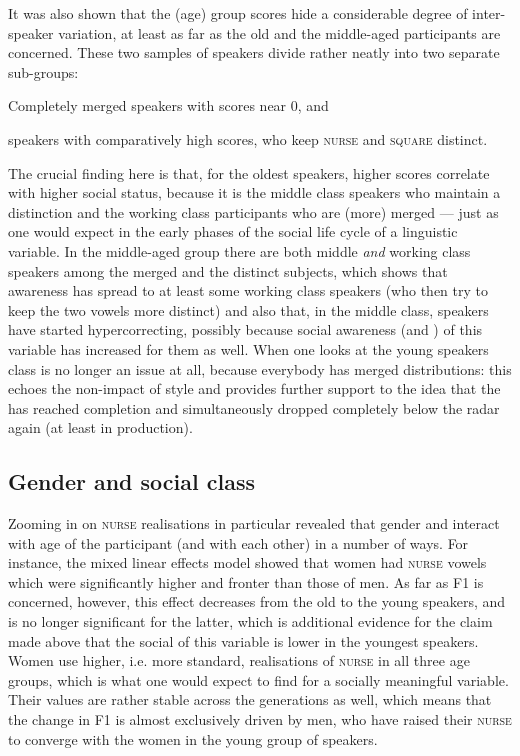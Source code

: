 It was also shown that the (age) group  scores hide a considerable degree of inter-speaker variation, at least as far as the old and the middle-aged participants are concerned.
These two samples of speakers divide rather neatly into two separate sub-groups:
\begin{inparaenum}[(1)]
	\item Completely merged speakers with  scores near 0, and
	\item speakers with comparatively high  scores, who keep \textsc{nurse} and \textsc{square} distinct.
\end{inparaenum}
The crucial finding here is that, for the oldest speakers, higher  scores correlate with higher social status, because it is the middle class speakers who maintain a distinction and the working class participants who are (more) merged --- just as one would expect in the early phases of the social life cycle of a linguistic variable.
In the middle-aged group there are both middle \emph{and} working class speakers among the merged and the distinct subjects, which shows that awareness has spread to at least some working class speakers (who then try to keep the two vowels more distinct) and also that, in the middle class, speakers have started hypercorrecting, possibly because social awareness (and ) of this variable has increased for them as well.
When one looks at the young speakers class is no longer an issue at all, because everybody has merged distributions: this echoes the non-impact of style and provides further support to the idea that the  has reached completion and simultaneously dropped completely below the radar again (at least in production).

\subsection{Gender and social class}
\label{prod.disc.nurse.social}

Zooming in on \textsc{nurse} realisations in particular revealed that gender and  interact with age of the participant (and with each other) in a number of ways.
For instance, the mixed linear effects model showed that women had \textsc{nurse} vowels which were significantly higher and fronter than those of men.
As far as F1 is concerned, however, this effect decreases from the old to the young speakers, and is no longer significant for the latter, which is additional evidence for the claim made above that the social  of this variable is lower in the youngest speakers.
Women use higher, i.e. more standard, realisations of \textsc{nurse} in all three age groups, which is what one would expect to find for a socially meaningful variable.
Their values are rather stable across the generations as well, which means that the  change in F1 is almost exclusively driven by men, who have raised their \textsc{nurse} to converge with the women in the young group of speakers.

